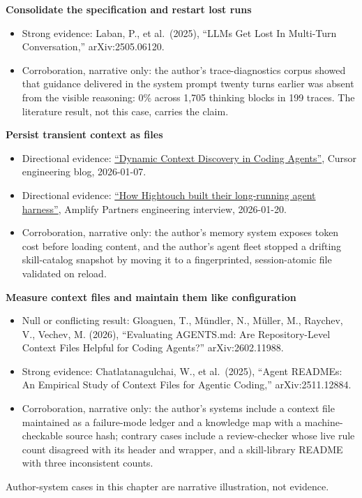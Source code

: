 \textbf{Consolidate the specification and restart lost runs}

\begin{itemize}
\tightlist
\item
  Strong evidence: Laban, P., et al.~(2025), ``LLMs Get Lost In Multi-Turn Conversation,'' arXiv:2505.06120.
\item
  Corroboration, narrative only: the author's trace-diagnostics corpus showed that guidance delivered in the system prompt twenty turns earlier was absent from the visible reasoning: 0\% across 1,705 thinking blocks in 199 traces. The literature result, not this case, carries the claim.
\end{itemize}

\textbf{Persist transient context as files}

\begin{itemize}
\tightlist
\item
  Directional evidence: \href{https://cursor.com/blog/dynamic-context-discovery}{``Dynamic Context Discovery in Coding Agents''}, Cursor engineering blog, 2026-01-07.
\item
  Directional evidence: \href{https://www.amplifypartners.com/blog-posts/how-hightouch-built-their-long-running-agent-harness}{``How Hightouch built their long-running agent harness''}, Amplify Partners engineering interview, 2026-01-20.
\item
  Corroboration, narrative only: the author's memory system exposes token cost before loading content, and the author's agent fleet stopped a drifting skill-catalog snapshot by moving it to a fingerprinted, session-atomic file validated on reload.
\end{itemize}

\textbf{Measure context files and maintain them like configuration}

\begin{itemize}
\tightlist
\item
  Null or conflicting result: Gloaguen, T., Mündler, N., Müller, M., Raychev, V., Vechev, M. (2026), ``Evaluating AGENTS.md: Are Repository-Level Context Files Helpful for Coding Agents?'' arXiv:2602.11988.
\item
  Strong evidence: Chatlatanagulchai, W., et al.~(2025), ``Agent READMEs: An Empirical Study of Context Files for Agentic Coding,'' arXiv:2511.12884.
\item
  Corroboration, narrative only: the author's systems include a context file maintained as a failure-mode ledger and a knowledge map with a machine-checkable source hash; contrary cases include a review-checker whose live rule count disagreed with its header and wrapper, and a skill-library README with three inconsistent counts.
\end{itemize}

Author-system cases in this chapter are narrative illustration, not evidence.
